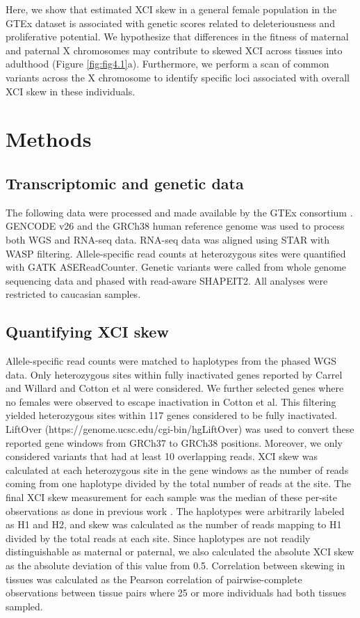 Here, we show that estimated XCI skew in a general female population in the GTEx dataset \cite{GTEx_Consortium2020-xx} is associated with genetic scores related to deleteriousness and proliferative potential. We hypothesize that differences in the fitness of maternal and paternal X chromosomes may contribute to skewed XCI across tissues into adulthood (Figure \ref{fig:fig4.1}a).  Furthermore, we perform a scan of common variants across the X chromosome to identify specific loci associated with overall XCI skew in these individuals.


\section{Methods}
\subsection{Transcriptomic and genetic data}

The following data were processed and made available by the GTEx consortium \cite{GTEx_Consortium2020-xx}. GENCODE v26 and the GRCh38 human reference genome was used to process both WGS and RNA-seq data. RNA-seq data was aligned using STAR with WASP filtering. Allele-specific read counts at heterozygous sites were quantified with GATK ASEReadCounter. Genetic variants were called from whole genome sequencing data and phased with read-aware SHAPEIT2. All analyses were restricted to caucasian samples. 

\subsection{Quantifying XCI skew}

Allele-specific read counts were matched to haplotypes from the phased WGS data. Only heterozygous sites within fully inactivated genes reported by Carrel and Willard \cite{Carrel2005-zm} and Cotton et al \cite{Cotton2013-jl} were considered. We further selected genes where no females were observed to escape inactivation in Cotton et al. This filtering yielded heterozygous sites within 117 genes considered to be fully inactivated. LiftOver (https://genome.ucsc.edu/cgi-bin/hgLiftOver) was used to convert these reported gene windows from GRCh37 to GRCh38 positions. Moreover, we only considered variants that had at least 10 overlapping reads. XCI skew was calculated at each heterozygous site in the gene windows as the number of reads coming from one haplotype divided by the total number of reads at the site. The final XCI skew measurement for each sample was the median of these per-site observations as done in previous work \cite{Shvetsova2019-re}. The haplotypes were arbitrarily labeled as H1 and H2, and skew was calculated as the number of reads mapping to H1 divided by the total reads at each site. Since haplotypes are not readily distinguishable as maternal or paternal, we also calculated the absolute XCI skew as the absolute deviation of this value from 0.5. Correlation between skewing in tissues was calculated as the Pearson correlation of pairwise-complete observations between tissue pairs where 25 or more individuals had both tissues sampled. 

